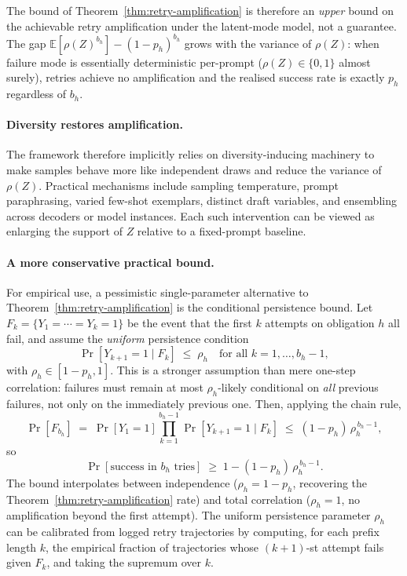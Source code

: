 \documentclass[11pt]{article}
\begin{document}
The bound of Theorem~\ref{thm:retry-amplification} is therefore an \emph{upper} bound on the achievable
retry amplification under the latent-mode model, not a guarantee. The gap
$\mathbb{E}[\rho(Z)^{b_h}]-(1-p_h)^{b_h}$ grows with the variance of $\rho(Z)$:
when failure mode is essentially deterministic per-prompt ($\rho(Z)\in\{0,1\}$
almost surely), retries achieve no amplification and the realised success rate
is exactly $p_h$ regardless of $b_h$.

\paragraph{Diversity restores amplification.}
The framework therefore implicitly relies on diversity-inducing machinery to
make samples behave more like independent draws and reduce the variance of
$\rho(Z)$. Practical mechanisms include sampling temperature, prompt
paraphrasing, varied few-shot exemplars, distinct draft variables, and
ensembling across decoders or model instances. Each such intervention can be
viewed as enlarging the support of $Z$ relative to a fixed-prompt baseline.

\paragraph{A more conservative practical bound.}
For empirical use, a pessimistic single-parameter alternative to Theorem~\ref{thm:retry-amplification} is
the conditional persistence bound. Let $F_k=\{Y_1=\cdots=Y_k=1\}$ be the
event that the first $k$ attempts on obligation $h$ all fail, and assume the
\emph{uniform} persistence condition
\[
\Pr[Y_{k+1}=1 \mid F_k] \;\le\; \rho_h
\quad \text{for all } k=1,\dots,b_h-1,
\]
with $\rho_h\in[1-p_h,1]$. This is a stronger assumption than mere one-step
correlation: failures must remain at most $\rho_h$-likely conditional on
\emph{all} previous failures, not only on the immediately previous one. Then,
applying the chain rule,
\[
\Pr[F_{b_h}]
\;=\;
\Pr[Y_1=1]\prod_{k=1}^{b_h-1}\Pr[Y_{k+1}=1\mid F_k]
\;\le\;
(1-p_h)\,\rho_h^{\,b_h-1},
\]
so
\[
\Pr[\text{success in } b_h \text{ tries}]
\;\ge\;
1 - (1-p_h)\,\rho_h^{\,b_h-1}.
\]
The bound interpolates between independence ($\rho_h=1-p_h$, recovering the
Theorem~\ref{thm:retry-amplification} rate) and total correlation ($\rho_h=1$, no amplification beyond
the first attempt). The uniform persistence parameter $\rho_h$ can be
calibrated from logged retry trajectories by computing, for each prefix
length $k$, the empirical fraction of trajectories whose $(k{+}1)$-st
attempt fails given $F_k$, and taking the supremum over $k$.
\end{document}
